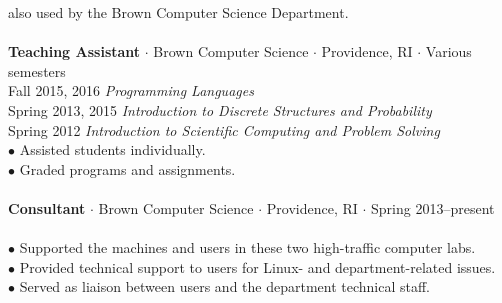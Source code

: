 \documentclass{res}
\newcommand{\sectionVspace}{\vspace{-0.40in}}
\newcommand{\sbreak}{\\[-0.15in]}
\begin{document}
\begin{resume}
\begin{tabbing}
            \>\phantom{$\bullet$} also used by the Brown Computer Science Department.\\
        \sbreak
        {\bf Teaching Assistant} $\cdot$ Brown Computer Science $\cdot$ Providence, RI $\cdot$ Various semesters\\
            \>Fall   2015, 2016 \>\>\> {\em Programming Languages}\\
            \>Spring 2013, 2015 \>\>\> {\em Introduction to Discrete Structures and Probability}\\
            \>Spring 2012       \>\>\> {\em Introduction to Scientific Computing and Problem Solving}\\
            \>$\bullet$  Assisted students individually.\\
            \>$\bullet$  Graded programs and assignments.\\
        \sbreak
        {\bf Consultant} $\cdot$ Brown Computer Science $\cdot$ Providence, RI $\cdot$ Spring 2013--present\\
            \\
            \>$\bullet$ Supported the machines and users in these two high-traffic computer labs.\\
            \>$\bullet$ Provided technical support to users for Linux- and department-related issues.\\
            \>$\bullet$ Served as  liaison between users and the department technical staff.\\
   \end{tabbing}
\sectionVspace

\end{resume}
\end{document}
